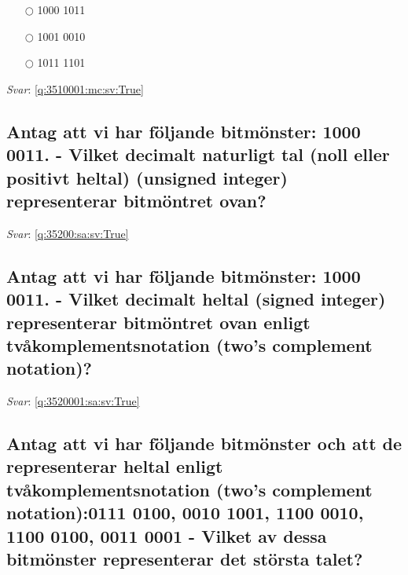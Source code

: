 \documentclass[a4paper,11pt,oneside]{article}
\begin{document}
\begin{sloppypar}
\label{q:3510001:mc:sv:False}

\begin{itemize}
  \item[$\bigcirc$] 1000 1011
  \item[$\bigcirc$] 1001 0010
  \item[$\bigcirc$] 1011 1101
\end{itemize}

\vspace{1cm}

\textit{Svar}: \autoref{q:3510001:mc:sv:True}



\subsection{Antag att vi har f\"oljande bitm\"onster: 1000 0011. - Vilket decimalt naturligt tal (noll eller positivt heltal) (unsigned integer) representerar bitm\"ontret ovan?}

\label{q:35200:sa:sv:False}

\vspace{2cm}

\noindent\makebox[\textwidth]{\hrulefill}

\vspace{1cm}

\textit{Svar}: \autoref{q:35200:sa:sv:True}

\subsection{Antag att vi har f\"oljande bitm\"onster: 1000 0011. - Vilket decimalt heltal (signed integer) representerar bitm\"ontret ovan enligt tv\r{a}komplementsnotation (two{\textquoteright}s complement notation)?}

\label{q:3520001:sa:sv:False}

\vspace{2cm}

\noindent\makebox[\textwidth]{\hrulefill}

\vspace{1cm}

\textit{Svar}: \autoref{q:3520001:sa:sv:True}



\subsection{Antag att vi har f\"oljande bitm\"onster och att de representerar heltal enligt tv\r{a}komplementsnotation (two{\textquoteright}s complement notation):0111 0100, 0010 1001, 1100 0010, 1100 0100, 0011 0001 - Vilket av dessa bitm\"onster representerar det st\"orsta talet?}


\end{sloppypar}
\end{document}
